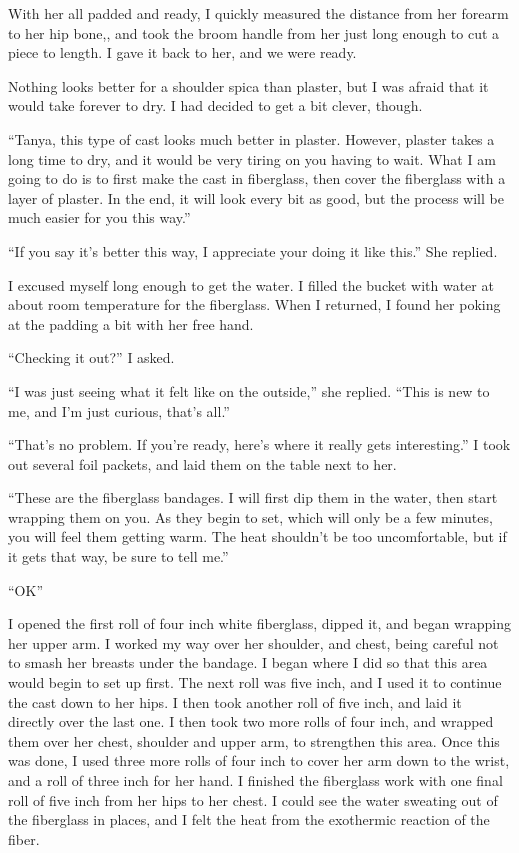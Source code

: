 With her all padded and ready, I quickly measured the distance from her forearm to her hip
bone,, and took the broom handle from her just long enough to cut a piece to length. I gave it
back to her, and we were ready.

Nothing looks better for a shoulder spica than plaster, but I was afraid that it would take
forever to dry. I had decided to get a bit clever, though.

``Tanya, this type of cast looks much better in plaster. However, plaster takes a long time
to dry, and it would be very tiring on you having to wait. What I am going to do is to first
make the cast in fiberglass, then cover the fiberglass with a layer of plaster. In the end, it
will look every bit as good, but the process will be much easier for you this way.''

``If you say it's better this way, I appreciate your doing it like this.'' She replied.

I excused myself long enough to get the water. I filled the bucket with water at about room
temperature for the fiberglass. When I returned, I found her poking at the padding a bit with
her free hand.

``Checking it out?'' I asked.

``I was just seeing what it felt like on the outside,'' she replied. ``This is new to me, and
I'm just curious, that's all.''

``That's no problem. If you're ready, here's where it really gets interesting.'' I took out
several foil packets, and laid them on the table next to her.

``These are the fiberglass bandages. I will first dip them in the water, then start wrapping
them on you. As they begin to set, which will only be a few minutes, you will feel them getting
warm. The heat shouldn't be too uncomfortable, but if it gets that way, be sure to tell me.''

``OK''

I opened the first roll of four inch white fiberglass, dipped it, and began wrapping her
upper arm. I worked my way over her shoulder, and chest, being careful not to smash her breasts
under the bandage. I began where I did so that this area would begin to set up first. The next
roll was five inch, and I used it to continue the cast down to her hips. I then took another
roll of five inch, and laid it directly over the last one. I then took two more rolls of four
inch, and wrapped them over her chest, shoulder and upper arm, to strengthen this area. Once
this was done, I used three more rolls of four inch to cover her arm down to the wrist, and a
roll of three inch for her hand. I finished the fiberglass work with one final roll of five inch
from her hips to her chest. I could see the water sweating out of the fiberglass in places, and
I felt the heat from the exothermic reaction of the fiber.

